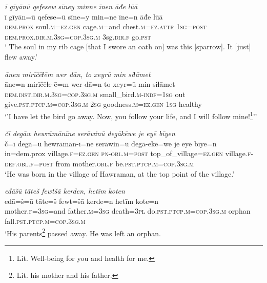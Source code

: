 \ea \label{DP.49}
\textit{ī gīyānū qefesew sīney minne īnen āđe lūā} \\ 
\gll ī gīyān=ū qefese=ū sīne=y min=ne īne=n āđe lūā \\ 
 \textsc{dem.prox} soul\textsc{.m}\textsc{=ez}\textsc{.gen} cage\textsc{.m}=and chest\textsc{.m}\textsc{=ez}.\textsc{attr} \textsc{1sg}\textsc{=\textsc{post}} \textsc{dem.prox}\textsc{.dir}\textsc{.m}\textsc{.3sg}\textsc{=cop}\textsc{.3sg}\textsc{.m} 3sg\textsc{.dir}\textsc{\textsc{.f}} go\textsc{.pst} \\ 
\glt ` The soul in my rib cage [that I swore an oath on] was this [sparrow]. It [just] flew away.'
\z 
 
\ea \label{DP.50}
\textit{ānen mirīčēɫēm wer dān, to xeyrū min siɫāmet} \\ 
\gll āne=n mirīčēɫe-ē=m wer dā=n to xeyr=ū min siɫāmet \\ 
 \textsc{dem.dist}\textsc{.dir}\textsc{.m}\textsc{.3sg}\textsc{=cop}\textsc{.3sg}\textsc{.m} small\_bird\textsc{.m}\textsc{-indf}\textsc{=1sg} out give\textsc{.pst}\textsc{.ptcp}\textsc{.m}\textsc{=cop}\textsc{.3sg}\textsc{.m} \textsc{2sg} goodness\textsc{.m}\textsc{=ez}\textsc{.gen} \textsc{1sg} healthy \\ 
\glt `’I have let the bird go away. Now, you follow your life, and I will follow mine!\footnote{Lit. Well-being for you and health for me.}’'
\z 
 
\ea \label{ZP.3}
\textit{čī degāw hewrāmānīne serāwinū degākēwe je eyē bīyen} \\ 
\gll č=ī degā=ū hewrāmān-ī=ne serāwin=ū degā-ekē=we je eyē bīye=n \\ 
 in=dem.prox village\textsc{.f}\textsc{\textsc{=ez.gen}} \textsc{pn}\textsc{-obl}\textsc{.m}\textsc{=\textsc{post}} top\_of\_village\textsc{\textsc{=ez.gen}} village\textsc{.f}\textsc{-def}\textsc{.obl}\textsc{.f}\textsc{=\textsc{post}} from mother\textsc{.obl}\textsc{.f} be\textsc{.pst}\textsc{.ptcp}\textsc{.m}\textsc{=cop}\textsc{.3sg}\textsc{.m} \\ 
\glt `He was born in the village of Hawraman, at the top point of the village.'
\z 
 
\ea \label{ZP.4}
\textit{eđāšū tāteš fewtšā kerden, hetīm koten} \\ 
\gll eđā=š=ū tāte=š fewt=šā kerde=n hetīm kote=n \\ 
 mother\textsc{.f}\textsc{=3sg}=and father\textsc{.m}\textsc{=3sg} death\textsc{=3pl} do\textsc{.pst}\textsc{.ptcp}\textsc{.m}\textsc{=cop}\textsc{.3sg}\textsc{.m} orphan fall\textsc{.pst}\textsc{.ptcp}\textsc{.m}\textsc{=cop}\textsc{.3sg}\textsc{.m} \\ 
\glt `His parents\footnote{Lit. his mother and his father.} passed away. He was left an orphan.\\ 
\z 

